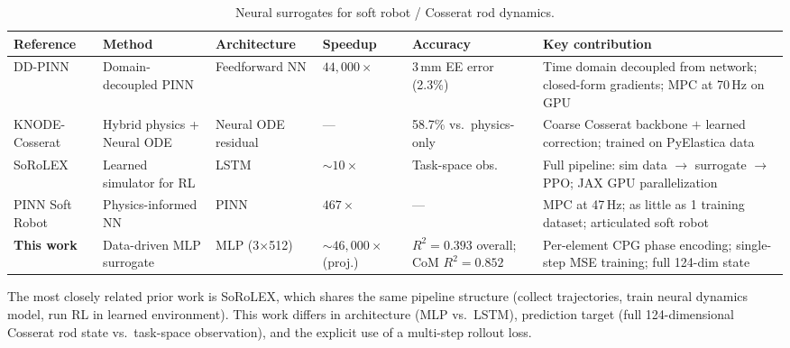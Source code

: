 \documentclass[11pt]{article}
\begin{document}
\begin{table}[H]
  \centering
  \footnotesize
  \renewcommand{\arraystretch}{1.35}
  \caption{Neural surrogates for soft robot / Cosserat rod dynamics.}
  \label{tab:related-surrogates}
  \begin{tabular}{@{}p{2.8cm}p{1.8cm}p{1.6cm}p{1.3cm}p{1.3cm}p{3.6cm}@{}}
    \toprule
    \textbf{Reference} & \textbf{Method} & \textbf{Architecture} & \textbf{Speedup} & \textbf{Accuracy} & \textbf{Key contribution} \\
    \midrule
    DD-PINN \newline \citep{Stolzle2025}
      & Domain-decoupled PINN
      & Feedforward NN
      & $44{,}000\times$
      & 3\,mm EE error (2.3\%)
      & Time domain decoupled from network; closed-form gradients; MPC at 70\,Hz on GPU \\
    \addlinespace
    KNODE-Cosserat \newline \citep{Hsieh2024}
      & Hybrid physics + Neural ODE
      & Neural ODE residual
      & ---
      & 58.7\% vs.\ physics-only
      & Coarse Cosserat backbone $+$ learned correction; trained on PyElastica data \\
    \addlinespace
    SoRoLEX \newline \citep{SoRoLEX2024}
      & Learned simulator for RL
      & LSTM
      & $\sim\!10\times$
      & Task-space obs.
      & Full pipeline: sim data $\to$ surrogate $\to$ PPO; JAX GPU parallelization \\
    \addlinespace
    PINN Soft Robot \newline \citep{PINNSoftRobot2025}
      & Physics-informed NN
      & PINN
      & $467\times$
      & ---
      & MPC at 47\,Hz; as little as 1 training dataset; articulated soft robot \\
    \midrule
    \textbf{This work}
      & Data-driven MLP surrogate
      & MLP (3$\times$512)
      & ${\sim}46{,}000\times$ (proj.)
      & $R^2{=}0.393$ overall; CoM $R^2{=}0.852$
      & Per-element CPG phase encoding; single-step MSE training; full 124-dim state \\
    \bottomrule
  \end{tabular}
\end{table}

\noindent
The most closely related prior work is SoRoLEX, which shares the same pipeline structure (collect trajectories, train neural dynamics model, run RL in learned environment).
This work differs in architecture (MLP vs.\ LSTM), prediction target (full 124-dimensional Cosserat rod state vs.\ task-space observation), and the explicit use of a multi-step rollout loss.
\end{document}
